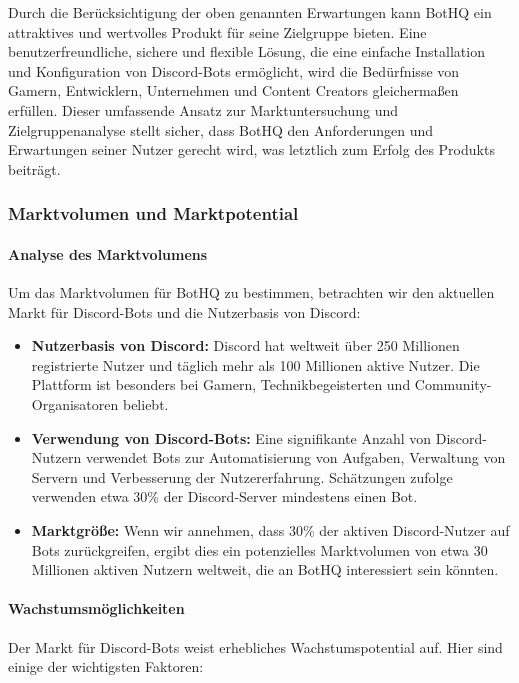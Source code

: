 
Durch die Berücksichtigung der oben genannten Erwartungen kann BotHQ ein attraktives und wertvolles Produkt für seine Zielgruppe bieten. Eine benutzerfreundliche, sichere und flexible Lösung, die eine einfache Installation und Konfiguration von Discord-Bots ermöglicht, wird die Bedürfnisse von Gamern, Entwicklern, Unternehmen und Content Creators gleichermaßen erfüllen.
Dieser umfassende Ansatz zur Marktuntersuchung und Zielgruppenanalyse stellt sicher, dass BotHQ den Anforderungen und Erwartungen seiner Nutzer gerecht wird, was letztlich zum Erfolg des Produkts beiträgt.

\subsubsection{Marktvolumen und Marktpotential}\label{marktvolumen-und-marktpotential}

\paragraph{Analyse des Marktvolumens}
Um das Marktvolumen für BotHQ zu bestimmen, betrachten wir den aktuellen Markt für Discord-Bots und die Nutzerbasis von Discord:

\begin{itemize}
  \item \textbf{Nutzerbasis von Discord:} Discord hat weltweit über 250 Millionen registrierte Nutzer und täglich mehr als 100 Millionen aktive Nutzer. Die Plattform ist besonders bei Gamern, Technikbegeisterten und Community-Organisatoren beliebt.

  \item \textbf{Verwendung von Discord-Bots:} Eine signifikante Anzahl von Discord-Nutzern verwendet Bots zur Automatisierung von Aufgaben, Verwaltung von Servern und Verbesserung der Nutzererfahrung. Schätzungen zufolge verwenden etwa 30\% der Discord-Server mindestens einen Bot.

  \item \textbf{Marktgröße:} Wenn wir annehmen, dass 30\% der aktiven Discord-Nutzer auf Bots zurückgreifen, ergibt dies ein potenzielles Marktvolumen von etwa 30 Millionen aktiven Nutzern weltweit, die an BotHQ interessiert sein könnten.
\end{itemize}

\paragraph{Wachstumsmöglichkeiten}
Der Markt für Discord-Bots weist erhebliches Wachstumspotential auf. Hier sind einige der wichtigsten Faktoren:


